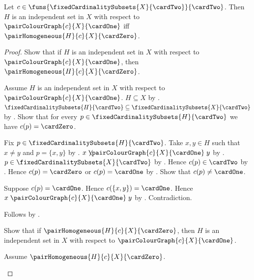 \begin{theorem}\label{two_colour_pair_graph_independent_iff}
    Let $c\in\funs{\fixedCardinalitySubsets{X}{\cardTwo}}{\cardTwo}$.
    Then $H$ is an independent set in $X$ with respect to
            $\pairColourGraph{c}{X}{\cardOne}$ iff
        $\pairHomogeneous{H}{c}{X}{\cardZero}$.
\end{theorem}
\begin{proof}
    Show that if $H$ is an independent set in $X$ with respect to
            $\pairColourGraph{c}{X}{\cardOne}$, then
        $\pairHomogeneous{H}{c}{X}{\cardZero}$.
    \begin{subproof}
        Assume $H$ is an independent set in $X$ with respect to
            $\pairColourGraph{c}{X}{\cardOne}$.
        $H\subseteq X$ by .
        $\fixedCardinalitySubsets{H}{\cardTwo}
            \subseteq\fixedCardinalitySubsets{X}{\cardTwo}$ by
            .
        Show that for every
            $p\in\fixedCardinalitySubsets{H}{\cardTwo}$ we have
            $c(p)=\cardZero$.
        \begin{subproof}
            Fix $p\in\fixedCardinalitySubsets{H}{\cardTwo}$.
            Take $x,y\in H$ such that $x\neq y$ and $p=\{x,y\}$ by
                .
            $x\not\mathrel{\pairColourGraph{c}{X}{\cardOne}}y$ by
                .
            $p\in\fixedCardinalitySubsets{X}{\cardTwo}$ by
                .
            Hence $c(p)\in\cardTwo$ by .
            Hence $c(p)=\cardZero$ or $c(p)=\cardOne$ by
                .
            Show that $c(p)\neq\cardOne$.
            \begin{subproof}
                Suppose $c(p)=\cardOne$.
                Hence $c(\{x,y\})=\cardOne$.
                Hence $x\mathrel{\pairColourGraph{c}{X}{\cardOne}}y$ by
                    .
                Contradiction.
            \end{subproof}
        \end{subproof}
        Follows by .
    \end{subproof}
    Show that if $\pairHomogeneous{H}{c}{X}{\cardZero}$, then
        $H$ is an independent set in $X$ with respect to
            $\pairColourGraph{c}{X}{\cardOne}$.
    \begin{subproof}
        Assume $\pairHomogeneous{H}{c}{X}{\cardZero}$.

\end{subproof}
\end{proof}
